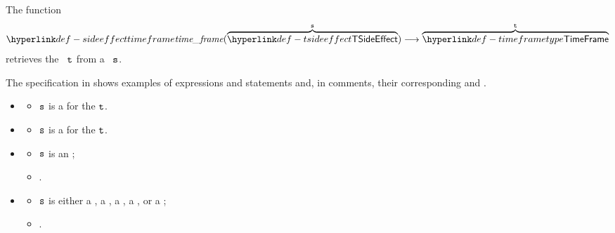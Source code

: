 \hypertarget{def-sideeffecttimeframe}{}
The function
\[
    \timeframe(\overname{\TSideEffect}{\vs}) \aslto \overname{\TTimeFrame}{\vt}
\]
retrieves the \timeframeterm\ $\vt$ from a \sideeffectdescriptorterm\ $\texttt{s}$.

The specification in  shows examples
of expressions and statements and, in comments, their corresponding \sideeffectdescriptorsetsterm{}
and \timeframesterm.

\ProseParagraph
\OneApplies
\begin{itemize}
    \item {}
    \begin{itemize}
        \item $\texttt{s}$ is a \ReadLocalTerm{} for the \timeframeterm{} $\vt$.
    \end{itemize}

    \item {}
    \begin{itemize}
        \item $\texttt{s}$ is a \ReadGlobalTerm{} for the \timeframeterm{} $\vt$.
    \end{itemize}

    \item {}
    \begin{itemize}
        \item $\texttt{s}$ is an \PerformsAssertionsTerm{};
        \item \Proseeqdef{$\vt$}{$\timeframeconstant$}.
    \end{itemize}

    \item {}
    \begin{itemize}
        \item $\texttt{s}$ is either a \WriteLocalTerm{}, a \WriteGlobalTerm{},
                a \NonDeterministicTerm{}, a \RecursiveCallTerm{}, or a
                \ThrowExceptionTerm{};
        \item \Proseeqdef{$\vt$}{$\timeframeexecution$}.
    \end{itemize}
\end{itemize}

\FormallyParagraph
{}

